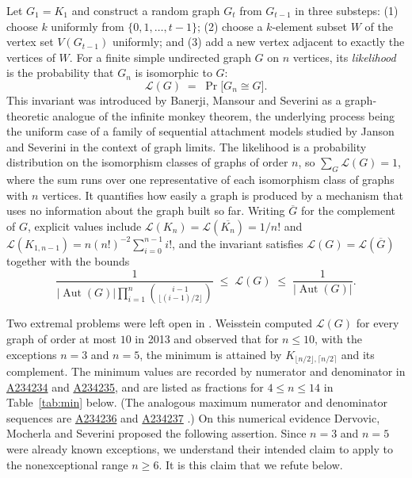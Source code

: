 \documentclass[11pt]{article}
\theoremstyle{definition}
\DeclareMathOperator{\Aut}{Aut}
\newcommand{\Lk}{\mathcal{L}}
\newcommand{\bin}[2]{\binom{#1}{#2}}
\newcommand{\Kbal}{K_{\lfloor n/2\rfloor,\lceil n/2\rceil}}
\begin{document}
Let $G_1=K_1$ and construct a random graph $G_t$ from $G_{t-1}$ in three substeps: (1) choose $k$ uniformly from $\{0,1,\dots,t-1\}$; (2) choose a $k$-element subset $W$ of the vertex set $V(G_{t-1})$ uniformly; and (3) add a new vertex adjacent to exactly the vertices of $W$. For a finite simple undirected graph $G$ on $n$ vertices, its \emph{likelihood} is the probability that $G_n$ is isomorphic to $G$:
\[
\Lk(G)\;=\;\Pr\big[G_n\cong G\big].
\]
This invariant was introduced by Banerji, Mansour and Severini \cite{BMS14} as a graph-theoretic analogue of the infinite monkey theorem, the underlying process being the uniform case of a family of sequential attachment models studied by Janson and Severini \cite{JS13} in the context of graph limits. The likelihood is a probability distribution on the isomorphism classes of graphs of order $n$, so $\sum_G\Lk(G)=1$, where the sum runs over one representative of each isomorphism class of graphs with $n$ vertices. It quantifies how easily a graph is produced by a mechanism that uses no information about the graph built so far. Writing $\overline G$ for the complement of $G$, explicit values include $\Lk(K_n)=\Lk(\overline{K_n})=1/n!$ and $\Lk(K_{1,n-1})=n(n!)^{-2}\sum_{i=0}^{n-1}i!$, and the invariant satisfies $\Lk(G)=\Lk(\overline G)$ together with the bounds \cite[Cor.~18]{BMS14}
\begin{equation}\label{eq:BMSbounds}
\frac{1}{\lvert\Aut(G)\rvert\prod_{i=1}^{n}\bin{i-1}{\lfloor (i-1)/2\rfloor}}\;\le\;\Lk(G)\;\le\;\frac{1}{\lvert\Aut(G)\rvert}.
\end{equation}

Two extremal problems were left open in \cite{BMS14}. Weisstein \cite{MW} computed $\Lk(G)$ for every graph of order at most $10$ in 2013 and observed that for $n\le 10$, with the exceptions $n=3$ and $n=5$, the minimum is attained by $\Kbal$ and its complement. The minimum values are recorded by numerator and denominator in \href{https://oeis.org/A234234}{A234234} and \href{https://oeis.org/A234235}{A234235}, and are listed as fractions for $4\le n\le14$ in Table~\ref{tab:min} below. (The analogous maximum numerator and denominator sequences are \href{https://oeis.org/A234236}{A234236} and \href{https://oeis.org/A234237}{A234237} \cite{OEIS}.) On this numerical evidence Dervovic, Mocherla and Severini \cite[\S5]{DMS18} proposed the following assertion. Since $n=3$ and $n=5$ were already known exceptions, we understand their intended claim to apply to the nonexceptional range $n\ge6$. It is this claim that we refute below.
\end{document}
